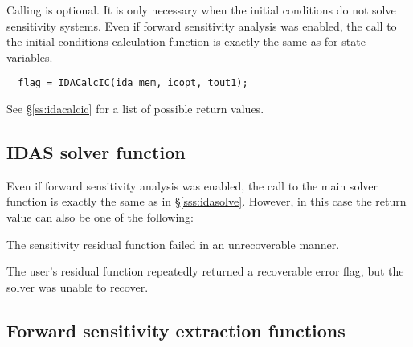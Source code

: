 Calling  is optional. It is only necessary when the  
initial conditions do not solve sensitivity systems. Even if forward 
sensitivity analysis was enabled, the call to the initial conditions
calculation function  is exactly the same as for state 
variables.

\begin{verbatim}
  flag = IDACalcIC(ida_mem, icopt, tout1);
\end{verbatim}

See \S\ref{ss:idacalcic} for a list of possible return values.


\subsection{IDAS solver function}
Even if forward sensitivity analysis was enabled, the call to the main solver 
function  is exactly the same as in \S\ref{sss:idasolve}. However, 
in this case the return value  can also be one of the following:
\begin{args}
\item[\Id{IDA\_SRES\_FAIL}]
  The sensitivity residual function failed in an unrecoverable manner.
\item[\Id{IDA\_REP\_SRES\_ERR}]
  The user's residual function repeatedly returned a recoverable error flag, 
  but the solver was unable to recover.
\end{args}


\subsection{Forward sensitivity extraction functions}\label{ss:sensi_get}

